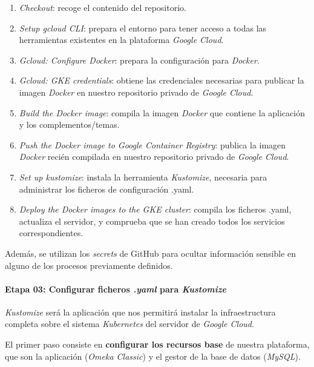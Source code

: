 \documentclass[
]{article}
\providecommand{\tightlist}{%
  \setlength{\itemsep}{0pt}\setlength{\parskip}{0pt}}
\begin{document}
\begin{enumerate}
\def\labelenumi{\arabic{enumi}.}
\tightlist
\item
  \emph{Checkout}: recoge el contenido del repositorio.
\item
  \emph{Setup gcloud CLI}: prepara el entorno para tener acceso a todas
  las herramientas existentes en la plataforma \emph{Google Cloud}.
\item
  \emph{Gcloud: Configure Docker}: prepara la configuración para
  \emph{Docker}.
\item
  \emph{Gcloud: GKE credentials}: obtiene las credenciales necesarias
  para publicar la imagen \emph{Docker} en nuestro repositorio privado
  de \emph{Google Cloud}.
\item
  \emph{Build the Docker image}: compila la imagen \emph{Docker} que
  contiene la aplicación y los complementos/temas.
\item
  \emph{Push the Docker image to Google Container Registry}: publica la
  imagen \emph{Docker} recién compilada en nuestro repositorio privado
  de \emph{Google Cloud}.
\item
  \emph{Set up kustomize}: instala la herramienta \emph{Kustomize},
  necesaria para administrar los ficheros de configuración .yaml.
\item
  \emph{Deploy the Docker images to the GKE cluster}: compila los
  ficheros .yaml, actualiza el servidor, y comprueba que se han creado
  todos los servicios correspondientes.
\end{enumerate}

Además, se utilizan los \emph{secrets} de GitHub para ocultar
información sensible en alguno de los procesos previamente definidos.

\hypertarget{etapa-03-configurar-ficheros-.yaml-para-kustomize}{%
\paragraph{\texorpdfstring{Etapa 03: Configurar ficheros \emph{.yaml}
para
\emph{Kustomize}}{Etapa 03: Configurar ficheros .yaml para Kustomize}}\label{etapa-03-configurar-ficheros-.yaml-para-kustomize}}

\emph{Kustomize} será la aplicación que nos permitirá instalar la
infraestructura completa sobre el sistema \emph{Kubernetes} del servidor
de \emph{Google Cloud}.

El primer paso consiste en \textbf{configurar los recursos base} de
nuestra plataforma, que son la aplicación (\emph{Omeka Classic}) y el
gestor de la base de datos (\emph{MySQL}).
\end{document}
